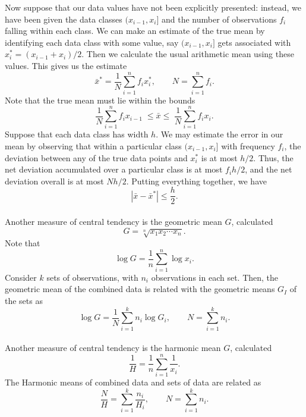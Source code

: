 \documentclass[11pt]{article}
\theoremstyle{definition}
\theoremstyle{remark}
\numberwithin{equation}{section}
\begin{document}
    Now suppose that our data values have not been explicitly presented: instead, we
    have been given the data classes $(x_{i - 1}, x_{i}]$ and the number of
    observations $f_i$ falling within each class. We can make an estimate of the true
    mean by identifying each data class with some value, say $(x_{i - 1}, x_{i}]$ gets
    associated with $x_i^* = (x_{i - 1} + x_{i}) / 2$. Then we calculate the usual
    arithmetic mean using these values. This gives us the estimate \[
        \bar{x}^* = \frac{1}{N}\sum_{i = 1}^n f_i x_i^*, \qquad 
        N = \sum_{i = 1}^n f_i.
    \] Note that the true mean must lie within the bounds \[
        \frac{1}{N}\sum_{i = 1}^{n} f_i x_{i - 1} \;\leq \bar{x} \leq\;
        \frac{1}{N}\sum_{i = 1}^{n} f_i x_{i}.
    \] Suppose that each data class has width $h$. We may estimate the error in our
    mean by observing that within a particular class $(x_{i - 1}, x_i]$ with
    frequency $f_i$, the deviation between any of the true data points and $x_i^*$ is
    at most $h / 2$. Thus, the net deviation accumulated over a particular class is
    at most $f_ih / 2$, and the net deviation overall is at most $Nh / 2$. Putting
    everything together, we have \[
        |\bar{x} - \bar{x}^*| \leq \frac{h}{2}.
    \] \\

    Another measure of central tendency is the geometric mean $G$, calculated \[
        G = \sqrt[n]{x_1x_2\cdots x_n}.
    \] Note that \[
        \log{G} = \frac{1}{n}\sum_{i = 1}^n \log{x_i}.
    \] Consider $k$ sets of observations, with $n_i$ observations in each set. Then,
    the geometric mean of the combined data is related with the geometric means $G_I$
    of the sets as \[
        \log{G} = \frac{1}{N}\sum_{i = 1}^k n_i\log{G_i}, \qquad N = \sum_{i = 1}^k
        n_i.
    \] \\

    Another measure of central tendency is the harmonic mean $G$, calculated \[
        \frac{1}{H} = \frac{1}{n}\sum_{i = 1}^n \frac{1}{x_i}.
    \] The Harmonic means of combined data and sets of data are related as \[
        \frac{N}{H} = \sum_{i = 1}^k \frac{n_i}{H_i}, \qquad N = \sum_{i = 1}^k n_i.
    \] 
\end{document}
